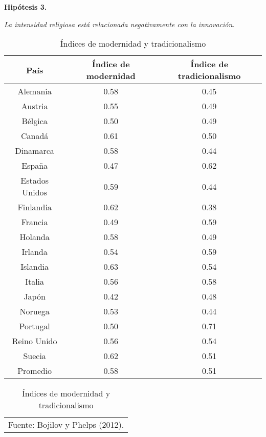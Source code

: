 \vspace{1em}
\noindent \textbf{Hipótesis 3.} \hfill\begin{minipage}{\dimexpr\textwidth-3cm}
\textit{La intensidad religiosa está relacionada negativamente con la innovación.}
\end{minipage}
\vspace{1em}


\begin{table}[H]
\centering
\caption{Índices de modernidad y tradicionalismo}
\label{PHEL}
\begin{tabular}{|ccc|}
\hline
 País & Índice de modernidad & Índice de tradicionalismo  \\ 
\hline
Alemania & 0.58 & 0.45 \\
Austria & 0.55 & 0.49  \\
Bélgica & 0.50 & 0.49  \\
Canadá & 0.61 & 0.50 \\
Dinamarca & 0.58 & 0.44 \\ 
España & 0.47 & 0.62 \\
Estados Unidos & 0.59 & 0.44  \\
Finlandia & 0.62 & 0.38 \\
Francia & 0.49 & 0.59 \\ 
Holanda & 0.58 & 0.49 \\ 
Irlanda & 0.54 & 0.59  \\
Islandia & 0.63 & 0.54 \\
Italia & 0.56 & 0.58  \\
Japón & 0.42 & 0.48 \\
Noruega & 0.53 & 0.44 \\
Portugal & 0.50 & 0.71 \\ 
Reino Unido & 0.56 & 0.54  \\
Suecia & 0.62 & 0.51 \\
Promedio & 0.58 & 0.51 \\
\hline
\end{tabular}

\begin{tabular}{c}
\footnotesize{Fuente: Bojilov y Phelps (2012).}
\end{tabular}

\end{table}

